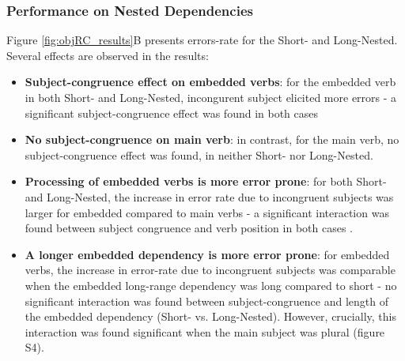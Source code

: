 \subsubsection{Performance on Nested Dependencies}
Figure \ref{fig:objRC_results}B presents errors-rate for the Short- and Long-Nested. Several effects are observed in the results: 
\begin{itemize}
    \item \textbf{Subject-congruence effect on embedded verbs}: for the embedded verb in both Short- and Long-Nested, incongurent subject elicited more errors - a significant subject-congruence effect was found in both cases 
    \item \textbf{No subject-congruence on main verb}: in contrast, for the main verb, no subject-congruence effect was found, in neither Short- nor Long-Nested. 
    \item \textbf{Processing of embedded verbs is more error prone}: for both Short- and Long-Nested, the increase in error rate due to incongruent subjects was larger for embedded compared to main verbs - a significant interaction was found between subject congruence and verb position in both cases .
    \item \textbf{A longer embedded dependency is more error prone}: for embedded verbs, the increase in error-rate due to incongruent subjects was comparable when the embedded long-range dependency was long compared to short - no significant interaction was found between subject-congruence and length of the embedded dependency (Short- vs. Long-Nested). However, crucially, this interaction was found significant when the main subject was plural (figure S4).
\end{itemize}

    

  

